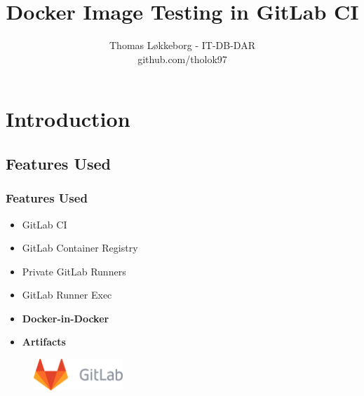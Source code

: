 \documentclass[14pt,aspectratio=169]{beamer}
\title[]{Docker Image Testing in GitLab CI}
\author[Author]{Thomas Løkkeborg - IT-DB-DAR\\\small github.com/tholok97}
\begin{document}

\cernSplashBlue

{
  \frame{\titlepage}
}
\setcounter{framenumber}{0}



\section{Introduction}

\subsection{Features Used}

\begin{frame}
  \frametitle{Features Used}
    \begin{itemize}
      \item GitLab CI
      \item GitLab Container Registry
      \item Private GitLab Runners
      \item GitLab Runner Exec
      \item \textbf{Docker-in-Docker}
      \item \textbf{Artifacts}
    \end{itemize}
  \begin{figure}
    \includegraphics[width=0.3\textwidth]{images/gitlab.png}
  \end{figure}
\end{frame}
\end{document}

